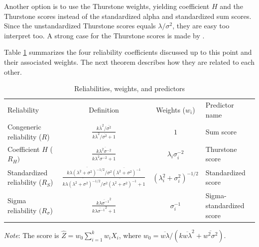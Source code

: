 \documentclass[twoside]{article}
\begin{document}
Another option is to use the Thurstone weights, yielding coefficient $H$ and the Thurstone scores instead of the standardized alpha and standardized sum scores. Since the unstandardized Thurstone scores equals $\lambda/\sigma^2$, they are easy too interpret too. A strong case for the Thurstone scores is made by \citet{McNeish2019-ea}.

Table \ref{tab:reliabilities_} summarizes the four reliability coefficients discussed up to this point and their associated weights. The next theorem describes how they are related to each other. 

\begin{table}
\label{tab:reliabilities_}
\noindent \begin{centering}
\caption{Reliabilities, weights, and predictors}
\begin{tabular}{lccl}
\toprule
 Reliability & Definition & Weights ($w_{i}$) & Predictor name\\
 \cmidrule{1-4}
Congeneric reliability ($R$) & $\frac{k\overline{\lambda}^{2}/\overline{\sigma^{2}}}{k\overline{\lambda}^{2}/\overline{\sigma^{2}}+1}$ & $1$ & Sum score \\[2ex]
Coefficient $H$ ($R_{H})$ & $\frac{k\overline{\lambda^{2}\sigma^{-2}}}{k\overline{\lambda^{2}\sigma^{-2}}+1}$ & $\lambda_{i}\sigma_{i}^{-2}$ & Thurstone score \\[2ex]
Standardized reliability ($R_{S}$) & $\frac{k\overline{\lambda(\lambda^{2}+\sigma^{2})^{-1/2}}/\overline{\sigma^{2}(\lambda^{2}+\sigma^{2})^{-1}}}{k\overline{\lambda(\lambda^{2}+\sigma^{2})^{-1/2}}/\overline{\sigma^{2}(\lambda^{2}+\sigma^{2})^{-1}}+1}$ & $(\lambda_{i}^{2}+\sigma_{i}^{2})^{-1/2}$ & Standardized score \\[2ex]
Sigma reliability $(R_{\sigma}$) & $\frac{k\overline{\lambda\sigma^{-1}}^{2}}{k\overline{\lambda\sigma^{-1}}^{2}+1}$ & $\sigma_{i}^{-1}$ & Sigma-standardized score \\[2ex]
\bottomrule
\end{tabular}
\par\end{centering}
\vskip7.0pt
\textit{Note}: The score is $\hat{Z} = w_{0}\sum_{i=1}^{k}w_iX_{i}$, where $w_0 = \overline{w\lambda}/(k\overline{w\lambda}^{2}+\overline{w^{2}\sigma^{2}})$.
\end{table}
\end{document}
